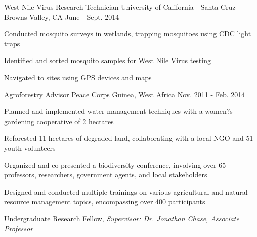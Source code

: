 

\begin{cventries}

  \cventry
    {West Nile Virus Research Technician} %
    {University of California - Santa Cruz} %
    {Browns Valley, CA} %
    {June - Sept. 2014} %
    {
      \begin{cvitems} %
        \item {Conducted mosquito surveys in wetlands, trapping mosquitoes using CDC light traps}
        \item {Identified and sorted mosquito samples for West Nile Virus testing}
        \item {Navigated to sites using GPS devices and maps}
      \end{cvitems}
    }
\medskip
  \cventry
    {Agroforestry Advisor} %
    {Peace Corps} %
    {Guinea, West Africa} %
    {Nov. 2011 - Feb. 2014} %
    {
      \begin{cvitems} %
        \item {Planned and implemented water management techniques with a women?s gardening cooperative of 2 hectares}
        \item {Reforested 11 hectares of degraded land, collaborating with a local NGO and 51 youth volunteers}
        \item {Organized and co-presented a biodiversity conference, involving over 65 professors, researchers, government agents, and local stakeholders}
        \item {Designed and conducted multiple trainings on various agricultural and natural resource management topics, encompassing over 400 participants}
      \end{cvitems}
    }
\medskip
  \cventry
    {Undergraduate Research Fellow, \textit{Supervisor: Dr. Jonathan Chase, Associate Professor}} %

\end{cventries}
